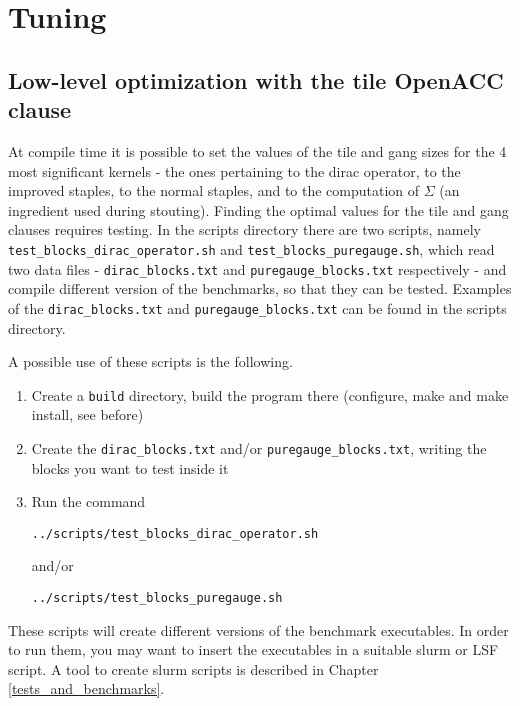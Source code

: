 \section{Tuning}
\label{tuning}

\subsection{Low-level optimization with the {\sf tile} OpenACC clause}

At compile time it is possible to set the values of the {\sf tile } and {\sf gang} sizes 
for the 4 most significant kernels - the ones pertaining to the 
dirac operator, to the improved staples, to the normal staples, and to the computation of
$\Sigma$ (an ingredient used during stouting).
Finding the optimal values for the {\sf tile} and {\sf gang} clauses requires testing. 
In the {\sf scripts} directory there are two scripts, namely 
\verb|test_blocks_dirac_operator.sh| and 
\verb|test_blocks_puregauge.sh|, which read two data files - 
\verb|dirac_blocks.txt| and 
\verb|puregauge_blocks.txt| respectively - and compile different version of the benchmarks, 
so that they can be tested. Examples of the \verb|dirac_blocks.txt| and 
\verb|puregauge_blocks.txt| can be found in the {\sf scripts} directory. 

A possible use of these scripts is the following.
\begin{enumerate}
 \item Create a \verb|build| directory, build the program there (configure, make and 
 make install, see before)
 \item Create the \verb|dirac_blocks.txt| and/or \verb|puregauge_blocks.txt|, writing 
 the blocks you want to test inside it
 \item Run the command
 \begin{verbatim}
../scripts/test_blocks_dirac_operator.sh
 \end{verbatim}
 and/or
 \begin{verbatim}
../scripts/test_blocks_puregauge.sh  
 \end{verbatim}
\end{enumerate}
 These scripts will create different versions of the benchmark executables. In order to run 
 them, you may want to insert the executables in a suitable slurm or LSF script.
 A tool to create slurm scripts is described in Chapter \ref{tests_and_benchmarks}.
 
